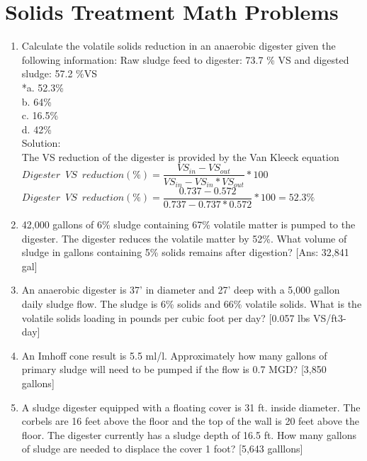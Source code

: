 \section*{Solids Treatment Math Problems}
\begin{enumerate}
\item Calculate the volatile solids reduction in an anaerobic digester given the following information: Raw sludge feed to digester: 73.7 \% VS and digested sludge: 57.2 \%VS\\

*a. 52.3\% \\
b. 64\%\\
c. 16.5\% \\
d. 42\% \\
\vspace{0.25cm}
Solution:\\
\vspace{0.25cm}  
The VS reduction of the digester is provided by the Van Kleeck equation \\ 
\vspace{0.25cm}
$Digester \enspace VS \enspace reduction (\%)=\dfrac{VS_{in}-VS_{out}}{VS_{in}-VS_{in}*VS_{out}}*100$\\
\vspace{0.25cm}
$Digester \enspace VS \enspace reduction (\%)=\dfrac{0.737-0.572}{0.737-0.737*0.572}*100=\boxed{ 52.3\%}$\\





\item 42,000 gallons of 6\% sludge containing 67\% volatile matter is pumped to the digester.  The digester reduces the volatile matter by 52\%.  What volume of sludge in gallons containing 5\% solids remains after digestion? [Ans:  32,841 gal]

\item An anaerobic digester is 37’ in diameter and 27’ deep with a 5,000 gallon daily sludge flow. The sludge is 6\% solids and 66\% volatile solids.  What is the volatile solids loading in pounds per cubic foot per day? [0.057 lbs VS/ft3-day]

\item An Imhoff cone result is 5.5 ml/l.  Approximately how many gallons of primary sludge will need to be pumped if the flow is 0.7 MGD? [3,850 gallons]

\item A sludge digester equipped with a floating cover is 31 ft. inside diameter.  The corbels are 16 feet above the floor and the top of the wall is 20 feet above the floor.  The digester currently has a sludge depth of 16.5 ft. How many gallons of sludge are needed to displace the cover 1 foot? [5,643 galllons]


\end{enumerate}
